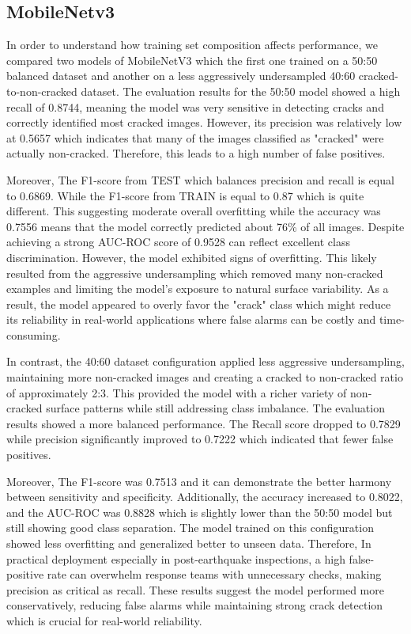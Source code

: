 \subsection{MobileNetv3}

In order to understand how training set composition affects performance, we compared two models of MobileNetV3 which the first one trained on a 50:50 balanced dataset and another on a less aggressively undersampled 40:60 cracked-to-non-cracked dataset. The evaluation results for the 50:50 model showed a high recall of 0.8744, meaning the model was very sensitive in detecting cracks and correctly identified most cracked images. However, its precision was relatively low at 0.5657 which indicates that many of the images classified as "cracked" were actually non-cracked. Therefore, this leads to a high number of false positives. 

Moreover, The F1-score from TEST which balances precision and recall is equal to 0.6869. While the F1-score from TRAIN is equal to 0.87 which is quite different. This suggesting moderate overall overfitting while the accuracy was 0.7556 means that the model correctly predicted about 76\% of all images. Despite achieving a strong AUC-ROC score of 0.9528 can reflect excellent class discrimination. However, the model exhibited signs of overfitting. This likely resulted from the aggressive undersampling which removed many non-cracked examples and limiting the model’s exposure to natural surface variability. As a result, the model appeared to overly favor the "crack" class which might reduce its reliability in real-world applications where false alarms can be costly and time-consuming.

In contrast, the 40:60 dataset configuration applied less aggressive undersampling, maintaining more non-cracked images and creating a cracked to non-cracked ratio of approximately 2:3. This provided the model with a richer variety of non-cracked surface patterns while still addressing class imbalance. The evaluation results showed a more balanced performance. The Recall score dropped to 0.7829 while precision significantly improved to 0.7222 which indicated that fewer false positives. 

Moreover, The F1-score was 0.7513 and it can demonstrate the better harmony between sensitivity and specificity. Additionally, the accuracy increased to 0.8022, and the AUC-ROC was 0.8828 which is slightly lower than the 50:50 model but still showing good class separation. The model trained on this configuration showed less overfitting and generalized better to unseen data. Therefore, In practical deployment especially in post-earthquake inspections, a high false-positive rate can overwhelm response teams with unnecessary checks, making precision as critical as recall. These results suggest the model performed more conservatively, reducing false alarms while maintaining strong crack detection which is crucial for real-world reliability.

